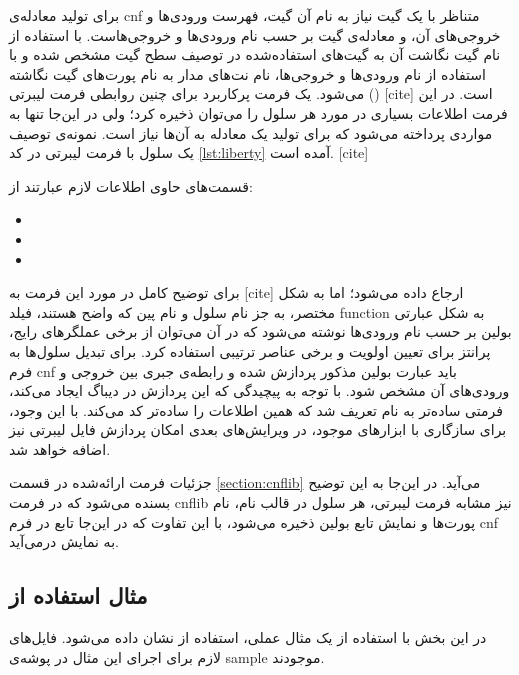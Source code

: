 \documentclass{article}
\begin{document}
برای تولید معادله‌ی cnf متناظر با یک گیت نیاز به نام آن گیت، فهرست ورودی‌ها و خروجی‌های آن، و معادله‌ی گیت بر حسب نام ورودی‌ها و خروجی‌هاست. با استفاده از نام گیت نگاشت آن به گیت‌های استفاده‌شده در توصیف سطح گیت مشخص شده و با استفاده از نام ورودی‌ها و خروجی‌ها، نام نت‌های مدار به نام پورت‌های گیت نگاشته می‌شود. یک فرمت پرکاربرد برای چنین روابطی فرمت لیبرتی () [cite] است. در این فرمت اطلاعات بسیاری در مورد هر سلول را می‌توان ذخیره کرد؛ ولی در این‌جا تنها به مواردی پرداخته می‌شود که برای تولید یک معادله به آن‌ها نیاز است. نمونه‌ی توصیف یک سلول با فرمت لیبرتی در کد \ref{lst:liberty} آمده است. [cite]

\begin{LTR}{}\end{LTR}

قسمت‌های حاوی اطلاعات لازم عبارتند از: 
\begin{itemize}
\item {}
\item {}
\item {}
\end{itemize}

برای توضیح کامل در مورد این فرمت به [cite] ارجاع داده می‌شود؛ اما به شکل مختصر، به جز نام سلول و نام پین که واضح هستند، فیلد function به شکل عبارتی بولین بر حسب نام ورودی‌ها نوشته می‌شود که در آن می‌توان از برخی عملگرهای رایج، پرانتز برای تعیین اولویت و برخی عناصر ترتیبی استفاده کرد. برای تبدیل سلول‌ها به فرم cnf باید عبارت بولین مذکور پردازش شده و رابطه‌ی جبری بین خروجی و ورودی‌های آن مشخص شود. با توجه به پیچیدگی که این پردازش در دیباگ ایجاد می‌کند، فرمتی ساده‌تر به نام  تعریف شد که همین اطلاعات را ساده‌تر کد می‌کند. با این وجود، برای سازگاری با ابزارهای موجود، در ویرایش‌های بعدی امکان پردازش فایل لیبرتی نیز اضافه خواهد شد. 

جزئیات فرمت ارائه‌شده در قسمت \ref{section:cnflib} می‌آید. در این‌جا به این توضیح بسنده می‌شود که در فرمت cnflib نیز مشابه فرمت لیبرتی، هر سلول در قالب نام، نام پورت‌ها و نمایش تابع بولین ذخیره می‌شود، با این تفاوت که در این‌جا تابع در فرم cnf به نمایش درمی‌آید. 

\subsection{مثال استفاده از }
در این بخش با استفاده از یک مثال عملی، استفاده از  نشان داده می‌شود. فایل‌های لازم برای اجرای این مثال در پوشه‌ی sample موجودند. 
\end{document}
